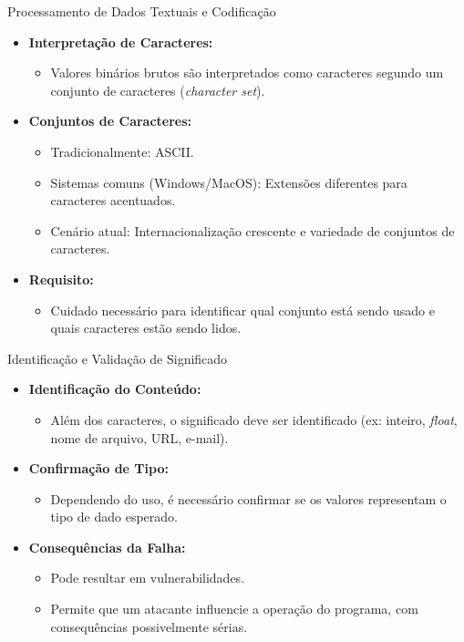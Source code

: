 \begin{frame}{Processamento de Dados Textuais e Codificação}
    \begin{itemize}
        \item \textbf{Interpretação de Caracteres:}
              \begin{itemize}
                  \item Valores binários brutos são interpretados como caracteres segundo um conjunto de caracteres (\textit{character set}).
              \end{itemize}

        \item \textbf{Conjuntos de Caracteres:}
              \begin{itemize}
                  \item Tradicionalmente: ASCII.
                  \item Sistemas comuns (Windows/MacOS): Extensões diferentes para caracteres acentuados.
                  \item Cenário atual: Internacionalização crescente e variedade de conjuntos de caracteres.
              \end{itemize}

        \item \textbf{Requisito:}
              \begin{itemize}
                  \item Cuidado necessário para identificar qual conjunto está sendo usado e quais caracteres estão sendo lidos.
              \end{itemize}
    \end{itemize}
\end{frame}
\begin{frame}{Identificação e Validação de Significado}
    \begin{itemize}
        \item \textbf{Identificação do Conteúdo:}
              \begin{itemize}
                  \item Além dos caracteres, o significado deve ser identificado (ex: inteiro, \textit{float}, nome de arquivo, URL, e-mail).
              \end{itemize}

        \item \textbf{Confirmação de Tipo:}
              \begin{itemize}
                  \item Dependendo do uso, é necessário confirmar se os valores representam o tipo de dado esperado.
              \end{itemize}

        \item \textbf{Consequências da Falha:}
              \begin{itemize}
                  \item Pode resultar em vulnerabilidades.
                  \item Permite que um atacante influencie a operação do programa, com consequências possivelmente sérias.
              \end{itemize}
    \end{itemize}
\end{frame}
